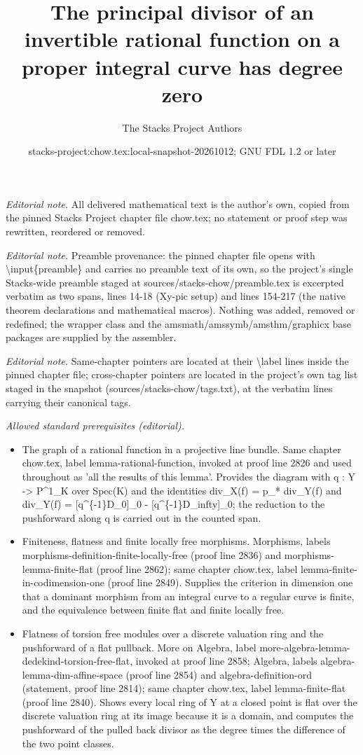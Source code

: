 \documentclass[10pt,a4paper]{amsart}
\title{The principal divisor of an invertible rational function on a proper integral curve has degree zero}
\author{The Stacks Project Authors}
\date{stacks-project:chow.tex:local-snapshot-20261012; GNU FDL 1.2 or later}
\theoremstyle{plain}
\theoremstyle{definition}
\theoremstyle{remark}
\numberwithin{equation}{subsection}
\begin{document}
\maketitle
\noindent\textit{Editorial note.} All delivered mathematical text is the author's own, copied from the pinned Stacks Project chapter file chow.tex; no statement or proof step was rewritten, reordered or removed.\par\medskip
\noindent\textit{Editorial note.} Preamble provenance: the pinned chapter file opens with \textbackslash{}input\{preamble\} and carries no preamble text of its own, so the project's single Stacks-wide preamble staged at sources/stacks-chow/preamble.tex is excerpted verbatim as two spans, lines 14-18 (Xy-pic setup) and lines 154-217 (the native theorem declarations and mathematical macros). Nothing was added, removed or redefined; the wrapper class and the amsmath/amssymb/amsthm/graphicx base packages are supplied by the assembler.\par\medskip
\noindent\textit{Editorial note.} Same-chapter pointers are located at their \textbackslash{}label lines inside the pinned chapter file; cross-chapter pointers are located in the project's own tag list staged in the snapshot (sources/stacks-chow/tags.txt), at the verbatim lines carrying their canonical tags.\par\medskip
\noindent\textit{Allowed standard prerequisites (editorial).}\begin{itemize}
\item The graph of a rational function in a projective line bundle. Same chapter chow.tex, label lemma-rational-function, invoked at proof line 2826 and used throughout as 'all the results of this lemma'. Provides the diagram with q : Y -> P\textasciicircum{}1\_K over Spec(K) and the identities div\_X(f) = p\_* div\_Y(f) and div\_Y(f) = [q\textasciicircum{}\{-1\}D\_0]\_0 - [q\textasciicircum{}\{-1\}D\_infty]\_0; the reduction to the pushforward along q is carried out in the counted span.
\item Finiteness, flatness and finite locally free morphisms. Morphisms, labels morphisms-definition-finite-locally-free (proof line 2836) and morphisms-lemma-finite-flat (proof line 2862); same chapter chow.tex, label lemma-finite-in-codimension-one (proof line 2849). Supplies the criterion in dimension one that a dominant morphism from an integral curve to a regular curve is finite, and the equivalence between finite flat and finite locally free.
\item Flatness of torsion free modules over a discrete valuation ring and the pushforward of a flat pullback. More on Algebra, label more-algebra-lemma-dedekind-torsion-free-flat, invoked at proof line 2858; Algebra, labels algebra-lemma-dim-affine-space (proof line 2854) and algebra-definition-ord (statement, proof line 2814); same chapter chow.tex, label lemma-finite-flat (proof line 2840). Shows every local ring of Y at a closed point is flat over the discrete valuation ring at its image because it is a domain, and computes the pushforward of the pulled back divisor as the degree times the difference of the two point classes.
\end{itemize}\medskip
\end{document}
